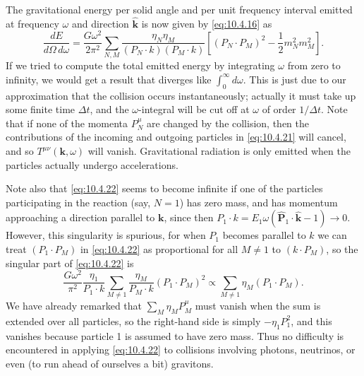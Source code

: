 The gravitational energy per solid angle and per unit frequency interval
emitted at frequency \(\omega\) and direction \(\widehat{\mathbf{k}}\) is
now given by \eqref{eq:10.4.16} as
\begin{equation}
  \frac{dE}{d\Omega\,d\omega}
  =
  \frac{G\omega^2}{2\pi^2}
  \sum_{N,M}
  \frac{\eta_N\eta_M}
       {(P_N\cdot k)(P_M\cdot k)}
  \left[
    (P_N\cdot P_M)^2-\frac12m_N^2m_M^2
  \right].
  \tag{10.4.22}\label{eq:10.4.22}
\end{equation}
If we tried to compute the total emitted energy by integrating \(\omega\)
from zero to infinity, we would get a result that diverges like
\(\int_0^\infty d\omega\). This is just due to our approximation that the
collision occurs instantaneously; actually it must take up some finite time
\(\Delta t\), and the \(\omega\)-integral will be cut off at \(\omega\) of
order \(1/\Delta t\). Note that if none of the momenta \(P_N^\mu\) are
changed by the collision, then the contributions of the incoming and outgoing
particles in \eqref{eq:10.4.21} will cancel, and so
\(T^{\mu\nu}(\mathbf{k},\omega)\) will vanish. Gravitational radiation is
only emitted when the particles actually undergo accelerations.

Note also that \eqref{eq:10.4.22} seems to become infinite if one of the
particles participating in the reaction (say, \(N=1\)) has zero mass, and
has momentum approaching a direction parallel to \(\mathbf{k}\), since then
\(P_1\cdot k=E_1\omega
(\widehat{\mathbf{P}}_1\cdot\widehat{\mathbf{k}}-1)\to0\). However, this
singularity is spurious, for when \(P_1\) becomes parallel to \(k\) we can
treat \((P_1\cdot P_M)\) in \eqref{eq:10.4.22} as proportional for all
\(M\ne1\) to \((k\cdot P_M)\), so the singular part of
\eqref{eq:10.4.22} is
\[
  \frac{G\omega^2}{\pi^2}
  \frac{\eta_1}{P_1\cdot k}
  \sum_{M\ne1}\frac{\eta_M}{P_M\cdot k}(P_1\cdot P_M)^2
  \propto
  \sum_{M\ne1}\eta_M(P_1\cdot P_M).
\]
We have already remarked that \(\sum_M\eta_MP_M^\mu\) must vanish when the
sum is extended over all particles, so the right-hand side is simply
\(-\eta_1P_1^2\), and this vanishes because particle 1 is assumed to have
zero mass. Thus no difficulty is encountered in applying
\eqref{eq:10.4.22} to collisions involving photons, neutrinos, or even (to
run ahead of ourselves a bit) gravitons.

